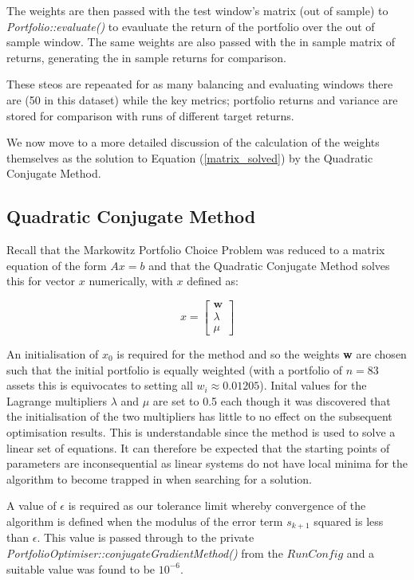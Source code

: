 \documentclass{article}
\begin{document}
The weights are then passed with the test window's matrix (out of sample) to \textit{Portfolio::evaluate()} to evauluate the return of the portfolio over the out of sample window. The same weights are also passed with the in sample matrix of returns, generating the in sample returns for comparison.


These steos are repeaated for as many balancing and evaluating windows there are (50 in this dataset) while the key metrics; portfolio returns and variance are stored for comparison with runs of different target returns.


We now move to a more detailed discussion of the calculation of the weights themselves as the solution to Equation (\ref{matrix_solved}) by the Quadratic Conjugate Method.


\subsection{Quadratic Conjugate Method}
\label{sec:qcm}


Recall that the Markowitz Portfolio Choice Problem was reduced to a matrix equation of the form $Ax = b$ and that the Quadratic Conjugate Method solves this for vector $x$ numerically, with $x$ defined as:


\begin{equation}
x=
\begin{bmatrix}
\textbf{w}\\
\lambda \\
\mu
\end{bmatrix}
\end{equation}

An initialisation of $x_0$ is required for the method and so the weights \textbf{w} are chosen such that the initial portfolio is equally weighted (with a portfolio of $n = 83$ assets this is equivocates to setting all $w_i \approx 0.01205$). Inital values for the Lagrange multipliers $\lambda$ and $\mu$ are set to 0.5 each though it was discovered that the initialisation of the two multipliers has little to no effect on the subsequent optimisation results. This is understandable since the method is used to solve a linear set of equations. It can therefore be expected that the starting points of parameters are inconsequential as linear systems do not have local minima for the algorithm to become trapped in when searching for a solution.

A value of $\epsilon$ is required as our tolerance limit whereby convergence of the algorithm is defined when the modulus of the error term $s_{k+1}$ squared is less than $\epsilon$. This value is passed through to the private \textit{PortfolioOptimiser::conjugateGradientMethod()} from the $RunConfig$ and a suitable value was found to be $10^{-6}$.
\end{document}
